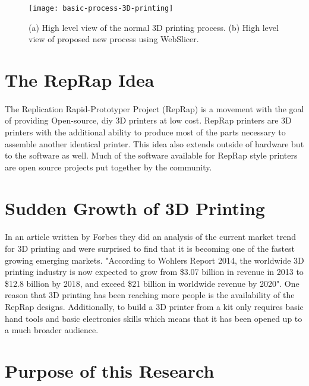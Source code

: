 \begin{figure}[!ht]
  \centering
  \texttt{[image: basic-process-3D-printing]}
  \caption{(a) High level view of the normal 3D printing process. (b) High level view of proposed new process using WebSlicer.}
\end{figure}


\section{The RepRap Idea}
\paragraph{}
The Replication Rapid-Prototyper Project (RepRap) is a movement with the goal of providing Open-source, diy 3D printers at low cost.
RepRap printers are 3D printers with the additional ability to produce most of the parts necessary to assemble another identical printer.
This idea also extends outside of hardware but to the software as well.
Much of the software available for RepRap style printers are open source projects put together by the community.

\section{Sudden Growth of 3D Printing}
\paragraph{}
In an article written by Forbes they did an analysis of the current market trend for 3D printing and were surprised to find that it is becoming one of the fastest growing emerging markets.
"According to Wohlers Report 2014, the worldwide 3D printing industry is now expected to grow from \$3.07 billion in revenue in 2013 to \$12.8 billion by 2018, and exceed \$21 billion in worldwide revenue by 2020". \citet{forbes3D}
One reason that 3D printing has been reaching more people is the availability of the RepRap designs.
Additionally, to build a 3D printer from a kit only requires basic hand tools and basic electronics skills which means that it has been opened up to a much broader audience.

\section{Purpose of this Research}
